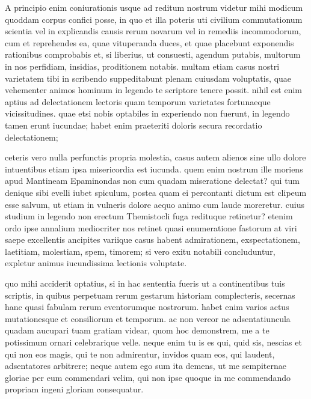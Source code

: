  A principio enim coniurationis usque ad reditum nostrum videtur mihi modicum quoddam corpus confici posse, in quo et illa poteris uti civilium commutationum scientia vel in explicandis causis rerum novarum vel in remediis incommodorum, cum et reprehendes ea, quae vituperanda duces, et quae placebunt exponendis rationibus comprobabis et, si liberius, ut consuesti, agendum putabis, multorum in nos perfidiam, insidias, proditionem notabis. multam etiam casus nostri varietatem tibi in scribendo suppeditabunt plenam cuiusdam voluptatis, quae vehementer animos hominum in legendo te scriptore tenere possit. nihil est enim aptius ad delectationem lectoris quam temporum varietates fortunaeque vicissitudines. quae etsi nobis optabiles in experiendo non fuerunt, in legendo tamen erunt iucundae; habet enim praeteriti doloris secura recordatio delectationem;

 ceteris vero nulla perfunctis propria molestia, casus autem alienos sine ullo dolore intuentibus etiam ipsa misericordia est iucunda. quem enim nostrum ille moriens apud Mantineam Epaminondas non cum quadam miseratione delectat? qui tum denique sibi evelli iubet spiculum, postea quam ei percontanti dictum est clipeum esse salvum, ut etiam in vulneris dolore aequo animo cum laude moreretur. cuius studium in legendo non erectum Themistocli fuga redituque retinetur? etenim ordo ipse annalium mediocriter nos retinet quasi enumeratione fastorum at viri saepe excellentis ancipites variique casus habent admirationem, exspectationem, laetitiam, molestiam, spem, timorem; si vero exitu notabili concluduntur, expletur animus iucundissima lectionis voluptate.

 quo mihi acciderit optatius, si in hac sententia fueris ut a continentibus tuis scriptis, in quibus perpetuam rerum gestarum historiam complecteris, secernas hanc quasi fabulam rerum eventorumque nostrorum. habet enim varios actus mutationesque et consiliorum et temporum. ac non vereor ne adsentatiuncula quadam aucupari tuam gratiam videar, quom hoc demonstrem, me a te potissimum ornari celebrarique velle. neque enim tu is es qui, quid sis, nescias et qui non eos magis, qui te non admirentur, invidos quam eos, qui laudent, adsentatores arbitrere; neque autem ego sum ita demens, ut me sempiternae gloriae per eum commendari velim, qui non ipse quoque in me commendando propriam ingeni gloriam consequatur.

